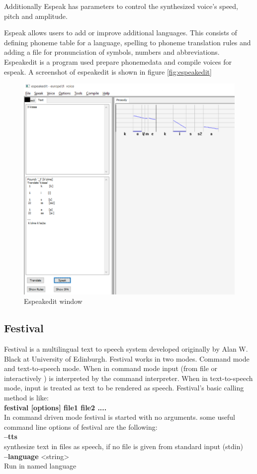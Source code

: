 \documentclass[11pt,a4paper,oneside,article]{memoir}
\begin{document}
Additionally Espeak has parameters to control the synthesized voice's speed, pitch and amplitude.

Espeak allows users to add or improve additional languages. This consists of defining phoneme table for a language, spelling to phoneme translation rules and adding a file for pronunciation of symbols, numbers and abbreviations. Espeakedit is a program used prepare phonemedata and compile voices for espeak. A screenshot of espeakedit is shown in figure \vref{fig:espeakedit}

\begin{figure}[h]
  \includegraphics[width=15cm]{espeakedit}
  \caption{Espeakedit window}
  \label{fig:espeakedit}
\end{figure}

\subsection{Festival}
Festival is a multilingual text to speech system developed originally by Alan W. Black at University of Edinburgh. Festival works in two modes. Command mode and text-to-speech mode. When in command mode input (from file or interactively ) is interpreted by the command interpreter. When in text-to-speech mode, input is treated as text to be rendered as speech.
Festival's basic calling method is like:\\
\textbf{festival [options] file1 file2 ....}\\
In command driven mode festival is started with no arguments.
some useful command line options of festival are the following:\\
\textbf{--tts}\\
synthesize text in files as speech, if no file is given from standard input (stdin)\\
\textbf{--language} <string>\\
Run in named language
\end{document}
